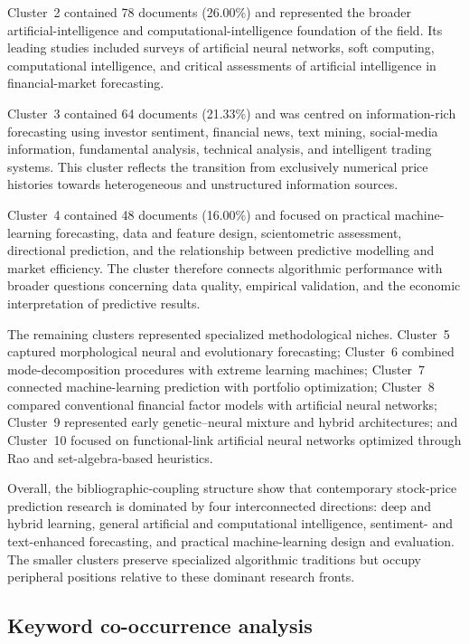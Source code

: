 \documentclass[pdflatex,sn-mathphys-num]{sn-jnl}%
\theoremstyle{thmstyleone}%
\theoremstyle{thmstyletwo}%
\theoremstyle{thmstylethree}%
\begin{document}
Cluster~2 contained 78 documents (26.00\%) and represented the broader
artificial-intelligence and computational-intelligence foundation of the
field. Its leading studies included surveys of artificial neural networks,
soft computing, computational intelligence, and critical assessments of
artificial intelligence in financial-market forecasting.

Cluster~3 contained 64 documents (21.33\%) and was centred on
information-rich forecasting using investor sentiment, financial news,
text mining, social-media information, fundamental analysis, technical
analysis, and intelligent trading systems. This cluster reflects the
transition from exclusively numerical price histories towards heterogeneous
and unstructured information sources.

Cluster~4 contained 48 documents (16.00\%) and focused on practical
machine-learning forecasting, data and feature design, scientometric
assessment, directional prediction, and the relationship between predictive
modelling and market efficiency. The cluster therefore connects algorithmic
performance with broader questions concerning data quality, empirical
validation, and the economic interpretation of predictive results.

The remaining clusters represented specialized methodological niches.
Cluster~5 captured morphological neural and evolutionary forecasting;
Cluster~6 combined mode-decomposition procedures with extreme learning
machines; Cluster~7 connected machine-learning prediction with portfolio
optimization; Cluster~8 compared conventional financial factor models with
artificial neural networks; Cluster~9 represented early genetic--neural
mixture and hybrid architectures; and Cluster~10 focused on functional-link
artificial neural networks optimized through Rao and set-algebra-based
heuristics.

Overall, the bibliographic-coupling structure show that contemporary
stock-price prediction research is dominated by four interconnected
directions: deep and hybrid learning, general artificial and computational
intelligence, sentiment- and text-enhanced forecasting, and practical
machine-learning design and evaluation. The smaller clusters preserve
specialized algorithmic traditions but occupy peripheral positions relative
to these dominant research fronts.


\subsection{Keyword co-occurrence analysis}
\end{document}
